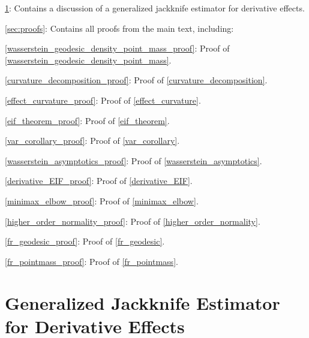 \documentclass[11pt,twoside]{article}
\theoremstyle{definition}
\theoremstyle{remark}
\begin{document}
\begin{description}

\item \cref{jackknife_supplement}: Contains a discussion of a generalized jackknife estimator for derivative effects.


\item \cref{sec:proofs}: Contains all proofs from the main text, including:
\begin{description}
    \item \cref{wasserstein_geodesic_density_point_mass_proof}: Proof of \cref{wasserstein_geodesic_density_point_mass}.
    \item \cref{curvature_decomposition_proof}: Proof of \cref{curvature_decomposition}.
    \item \cref{effect_curvature_proof}: Proof of \cref{effect_curvature}.
    \item \cref{eif_theorem_proof}: Proof of \cref{eif_theorem}.
    \item \cref{var_corollary_proof}: Proof of \cref{var_corollary}.
    \item \cref{wasserstein_asymptotics_proof}: Proof of \cref{wasserstein_asymptotics}.
    \item \cref{derivative_EIF_proof}: Proof of \cref{derivative_EIF}.
    \item \cref{minimax_elbow_proof}: Proof of \cref{minimax_elbow}.
    \item \cref{higher_order_normality_proof}: Proof of \cref{higher_order_normality}.
    \item \cref{fr_geodesic_proof}: Proof of \cref{fr_geodesic}.
    \item \cref{fr_pointmass_proof}: Proof of \cref{fr_pointmass}.

\end{description}
\end{description}


\section{Generalized Jackknife Estimator for Derivative Effects} \label{jackknife_supplement}
\end{document}
